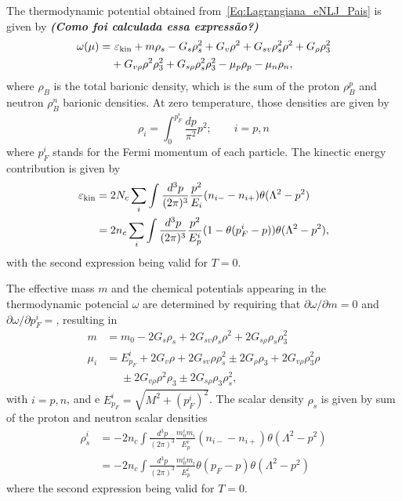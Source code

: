\documentclass[prc, reprint, amsmath, floatfix, linenumbers,10pt]{revtex4-1}
\newcommand{\comment}[1]{{\bf\textit{#1}}}
\begin{document}
The thermodynamic potential obtained from~\eqref{Eq:Lagrangiana_eNLJ_Pais} is given by \comment{(Como foi calculada essa expressão?)}
\begin{equation}\label{Eq:potencial_termodinamico}
\begin{split}
	\omega(\mu) =&~ \varepsilon_{\rm{kin}} + m\rho_s - G_s\rho_s^2 + G_v\rho^2 + G_{sv}\rho_s^2\rho^2 + G_\rho\rho_3^2 \\
	&+ G_{v\rho}\rho^2\rho_3^2 + G_{s\rho}\rho_s^2\rho_3^2 - \mu_p\rho_p - \mu_n\rho_n,
\end{split}
\end{equation}
%
where $\rho_B$ is the total barionic density, which is the sum of the proton $\rho_B^p$ and neutron $\rho_B^n$ barionic densities. At zero temperature, those densities are given by
\begin{equation}
	\rho_i = \int_0^{p_F^i}\frac{dp}{\pi^2}p^2; \qquad i = p,n
\end{equation}
%
where $p_F^i$ stands for the Fermi momentum of each particle. The kinectic energy contribution is given by
\begin{align}
	\varepsilon_{\rm{kin}} &= 2 N_c\sum_i \int \frac{d^3p}{(2\pi)^3}\frac{p^2}{E_i}(n_{i-}-n_{i+})\theta(\Lambda^2 - p^2) \\
	&= 2 n_c \sum_i \int \frac{d^3p}{(2\pi)^3}\frac{p^2}{E_p^i}(1 - \theta(p_F^i - p))\theta(\Lambda^2 - p^2),
\end{align}
%
with the second expression being valid for $T = 0$.

The effective mass $m$ and the chemical potentials appearing in the thermodynamic potencial $\omega$ are determined by requiring that $\partial\omega/\partial m = 0$ and $\partial\omega/\partial p_F^i = $, resulting in
\begin{align}\label{Eq:Gap}
	m &= m_0 - 2G_s\rho_s + 2G_{sv}\rho_s\rho^2 + 2 G_{s\rho}\rho_s\rho_3^2 \\
	\mu_i &= E_{p_F}^i + 2G_v\rho + 2G_{sv}\rho\rho_s^2 \pm 2G_\rho\rho_3+2G_{v\rho}\rho_3^2\rho \nonumber \\
	&\phantom{=} \pm 2G_{v\rho}\rho^2\rho_3 \pm 2 G_{s\rho}\rho_3\rho_s^2,
\end{align}
%
with $i = p,n$, and e $E_{p_F}^i = \sqrt{M^2 + (p_F^i)^2}$. The scalar density $\rho_s$ is given by sum of the proton and neutron scalar densities
\begin{align}
	\rho_s^i &= - 2 n_c \int \frac{d^3p}{(2\pi)^3}\frac{m_0^i m_i}{E_p^i}(n_{i-} - n_{i+})\theta(\Lambda^2 - p^2) \\
	&= - 2 n_c \int \frac{d^3p}{(2\pi)^3}\frac{m_0^i m_i}{E_p^i}\theta(p_F - p)\theta(\Lambda^2 - p^2)
\end{align}
%
where the second expression being valid for $T = 0$.
\end{document}
